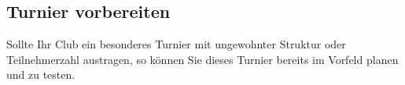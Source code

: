 \subsection{Turnier vorbereiten}

\noindent
Sollte Ihr Club ein besonderes Turnier mit ungewohnter Struktur oder Teilnehmerzahl
austragen, so können Sie dieses Turnier bereits im Vorfeld planen und zu testen.
